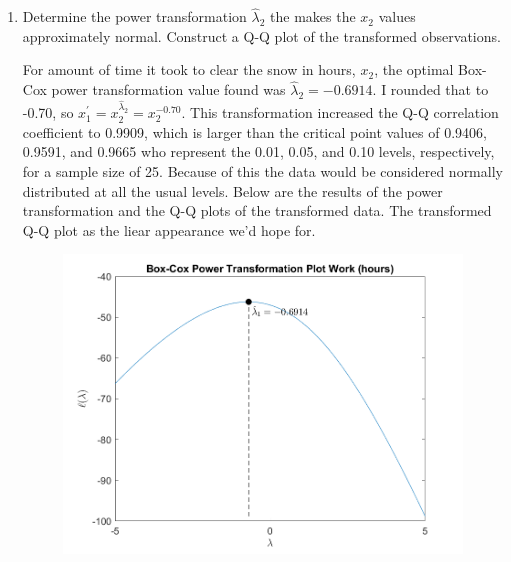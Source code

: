 \begin{enumerate}[label= (\alph*)]
    \item Determine the power transformation $\hat{\lambda}_{2}$ the makes the $x_{2}$ values approximately
    normal. Construct a Q-Q plot of the transformed observations.

    For amount of time it took to clear the snow in hours, $x_{2}$, the optimal Box-Cox power transformation value found was $\hat{\lambda}_{2} = -0.6914$.
    I rounded that to -0.70, so $x_{1}^{\prime} = x_{2}^{\hat{\lambda}_{2}} = x_{2}^{-0.70}$. This transformation increased the Q-Q correlation coefficient to 0.9909, which is larger than the critical point values of 0.9406, 0.9591, and 0.9665 who represent the 0.01, 0.05, and 0.10 levels, respectively, for a sample size of 25.
    Because of this the data would be considered normally distributed at all the usual levels.
    Below are the results of the power transformation and the Q-Q plots of the transformed data.
    The transformed Q-Q plot as the liear appearance we'd hope for.

    \begin{center}
        \begin{figure}[H]
            \centering
            \includegraphics[scale=0.4]{./matlab/chapter-4/sol4.41.power.2.png}
        \end{figure}
    \end{center}
    

\end{enumerate}
